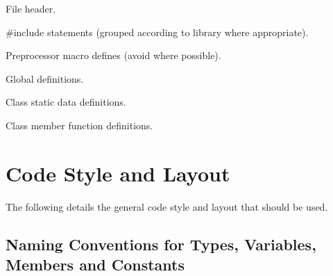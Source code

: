 \begin{DoxyItemize}
\begin{DoxyItemize}
\item File header.
\item \#include statements (grouped according to library where appropriate).
\item Preprocessor macro defines (avoid where possible).
\item Global definitions.
\item Class static data definitions.
\item Class member function definitions.
\end{DoxyItemize}
\end{DoxyItemize}\hypertarget{code_standards_code_standards_sec_2}{}\section{Code Style and Layout}\label{code_standards_code_standards_sec_2}
The following details the general code style and layout that should be used.\hypertarget{code_standards_code_standards_sec_2_1}{}\subsection{Naming Conventions for Types, Variables, Members and Constants}\label{code_standards_code_standards_sec_2_1}

